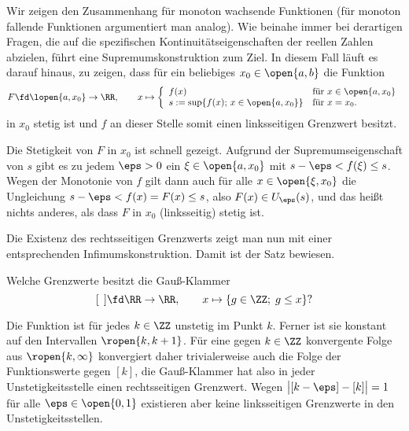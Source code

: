 \begin{antwort}
  Wir zeigen den Zusammenhang für monoton wachsende Funktionen 
  (für monoton fallende Funktionen argumentiert man analog).  
  Wie beinahe immer bei derartigen Fragen, 
  die auf die spezifischen Kontinuitätseigenschaften 
  der reellen Zahlen abzielen, 
  führt eine Supremumskonstruktion zum Ziel. In diesem Fall läuft es 
  darauf hinaus, zu zeigen, dass für ein beliebiges $x_0\in \open{a,b}$ 
  die Funktion 
  \[
  F \fd \lopen{a,x_0} \to \RR, \qquad
  x \mapsto \left\{ \begin{array}{ll}
      f(x) & \text{für $x\in \open{a,x_0}$} \\
      s:=\sup \{ f(x); \, x\in \open{a,x_0} \}  & \text{für $x=x_0$}.
    \end{array} \right.
  \]
  in $x_0$ stetig ist und $f$ an dieser Stelle somit einen linksseitigen 
  Grenzwert besitzt. 

  Die Stetigkeit von $F$ in $x_0$ ist schnell gezeigt.  
  Aufgrund der Supremumseigenschaft von $s$ gibt es zu jedem $\eps>0$ 
  ein $\xi \in \open{a,x_0}$ mit $s-\eps <f(\xi) \le s$. Wegen der 
  Monotonie von $f$ gilt dann auch für alle $x\in \open{\xi,x_0}$ 
  die Ungleichung $s-\eps < f(x)=F(x) \le s$, 
  also $F(x)\in U_\eps( s )$, und das heißt nichts anderes, 
  als dass $F$ in $x_0$ (linksseitig) stetig ist. 

  Die Existenz des rechtsseitigen Grenzwerts 
  zeigt man nun mit einer entsprechenden Infimumskonstruktion. 
  Damit ist der Satz bewiesen.   
  \AntEnd
\end{antwort}

\begin{frage}
  Welche Grenzwerte besitzt die Gauß-Klammer 
  \[
  [ \;\, ] \fd \RR \to \RR, \qquad 
  x \mapsto \{ g\in\ZZ; \; g\le x \} \text{?}
  \]
\end{frage}

\begin{antwort}
  Die Funktion ist für jedes $k\in \ZZ$ unstetig im Punkt $k$. Ferner ist sie   
  konstant auf den Intervallen $\ropen{k,k+1}$. 
  Für eine gegen $k\in\ZZ$ konvergente Folge aus $\ropen{k,\infty}$ konvergiert 
  daher trivialerweise auch die Folge der Funktionswerte gegen 
  $[ k ]$, die 
  Gauß-Klammer hat also in jeder Unstetigkeitsstelle einen rechtsseitigen 
  Grenzwert. Wegen $\big| [k-\eps]  - [ k ] \big|=1$ für alle 
  $\eps\in \open{0,1}$ existieren aber keine linksseitigen Grenzwerte in 
  den Unstetigkeitsstellen.
  \AntEnd
\end{antwort}

